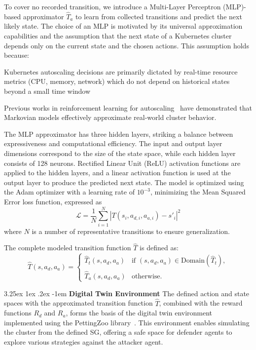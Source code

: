 \documentclass[conference]{IEEEtran}
\makeatletter
\renewcommand\paragraph{\@startsection{paragraph}{5}{\z@}%
  {3.25ex \@plus1ex \@minus.2ex}%
  {-1em}%
  {\normalfont\normalsize\bfseries}}
\makeatother
\begin{document}
To cover no recorded transition, we introduce a Multi-Layer Perceptron (MLP)-based approximator $\hat{T}_a$ to learn from collected transitions and predict the next likely state. The choice of an MLP is motivated by its universal approximation capabilities and the assumption that the next state of a Kubernetes cluster depends only on the current state and the chosen actions. This assumption holds because:
\begin{enumerate*}[label={\roman*)}, itemjoin={;\quad }]
    \item Kubernetes autoscaling decisions are primarily dictated by real-time resource metrics (CPU, memory, network) which do not depend on historical states beyond a small time window
    \item Previous works in reinforcement learning for autoscaling~\cite{Gari2021} have demonstrated that Markovian models effectively approximate real-world cluster behavior.
\end{enumerate*}
The MLP approximator has three hidden layers, striking a balance between expressiveness and computational efficiency. The input and output layer dimensions correspond to the size of the state space, while each hidden layer consists of 128 neurons. Rectified Linear Unit (ReLU) activation functions are applied to the hidden layers, and a linear activation function is used at the output layer to produce the predicted next state. The model is optimized using the Adam optimizer with a learning rate of $10^{-3}$, minimizing the Mean Squared Error loss function, expressed as
$$
\mathcal{L} = \frac{1}{N} \sum_{i=1}^N |T(s_i, a_{d,i}, a_{a,i}) - s'_i|^2
$$
where $N$ is a number of representative transitions to ensure generalization.

The complete modeled transition function $\hat{T}$ is defined as:
$$
\hat{T}(s, a_d, a_a) = 
\begin{cases} 
\hat{T}_t(s, a_d, a_a) & \text{if } (s, a_d, a_a) \in \text{Domain}(\hat{T}_t), \\
\hat{T}_a(s, a_d, a_a) & \text{otherwise}.
\end{cases}
$$

\noindent \paragraph{\textbf{Digital Twin Environment}} The defined action and state spaces with the approximated transition function $\hat{T}$, combined with the reward functions $R_d$ and $R_a$, forms the basis of the digital twin environment implemented using the PettingZoo library~\cite{Terry2021}. This environment enables simulating the cluster from the defined SG, offering a safe space for defender agents to explore various strategies against the attacker agent.
\end{document}
